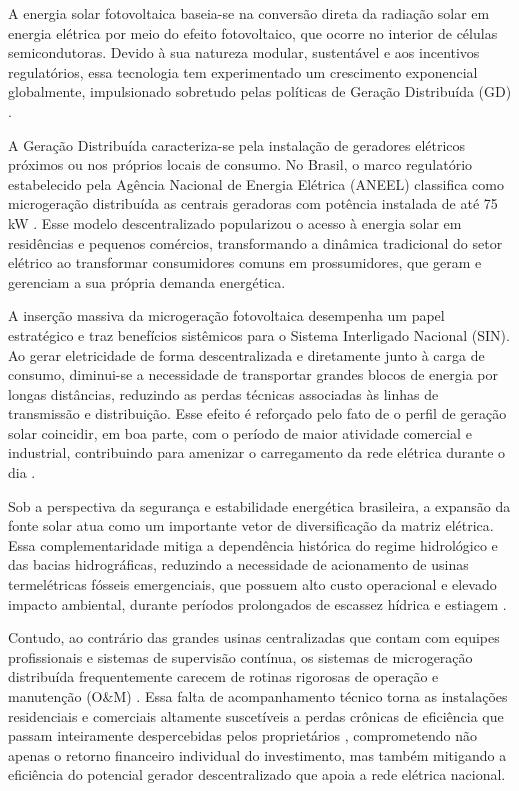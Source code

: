 \documentclass{UNESC}
\begin{document}
A energia solar fotovoltaica baseia-se na conversão direta da radiação
solar em energia elétrica por meio do efeito fotovoltaico, que ocorre no
interior de células semicondutoras. Devido à sua natureza modular,
sustentável e aos incentivos regulatórios, essa tecnologia tem
experimentado um crescimento exponencial globalmente, impulsionado
sobretudo pelas políticas de Geração Distribuída (GD) \cite{pinho2014manual}.

A Geração Distribuída caracteriza-se pela instalação de geradores
elétricos próximos ou nos próprios locais de consumo. No Brasil, o marco
regulatório estabelecido pela Agência Nacional de Energia Elétrica
(ANEEL) classifica como microgeração distribuída as centrais geradoras
com potência instalada de até 75 kW \cite{aneel2022}. Esse modelo
descentralizado popularizou o acesso à energia solar em residências e
pequenos comércios, transformando a dinâmica tradicional do setor
elétrico ao transformar consumidores comuns em prossumidores, que geram
e gerenciam a sua própria demanda energética.

A inserção massiva da microgeração fotovoltaica desempenha um papel
estratégico e traz benefícios sistêmicos para o Sistema Interligado
Nacional (SIN). Ao gerar eletricidade de forma descentralizada e
diretamente junto à carga de consumo, diminui-se a necessidade de
transportar grandes blocos de energia por longas distâncias, reduzindo
as perdas técnicas associadas às linhas de transmissão e distribuição.
Esse efeito é reforçado pelo fato de o perfil de geração solar coincidir,
em boa parte, com o período de maior atividade comercial e industrial,
contribuindo para amenizar o carregamento da rede elétrica durante o dia
\cite{pinho2014manual}.

Sob a perspectiva da segurança e estabilidade energética brasileira, a
expansão da fonte solar atua como um importante vetor de diversificação
da matriz elétrica. Essa complementaridade mitiga a dependência histórica
do regime hidrológico e das bacias hidrográficas, reduzindo a necessidade
de acionamento de usinas termelétricas fósseis emergenciais, que possuem
alto custo operacional e elevado impacto ambiental, durante períodos
prolongados de escassez hídrica e estiagem \cite{pinho2014manual}.

Contudo, ao contrário das grandes usinas centralizadas que contam com
equipes profissionais e sistemas de supervisão contínua, os sistemas de
microgeração distribuída frequentemente carecem de rotinas rigorosas de
operação e manutenção (O\&M) \cite{ilse2019, Tramontin_Rampinelli_2024}.
Essa falta de acompanhamento técnico torna as instalações residenciais e
comerciais altamente suscetíveis a perdas crônicas de eficiência que
passam inteiramente despercebidas pelos proprietários
\cite{kalimeris2023data}, comprometendo não apenas o retorno financeiro
individual do investimento, mas também mitigando a eficiência do
potencial gerador descentralizado que apoia a rede elétrica nacional.
\end{document}
